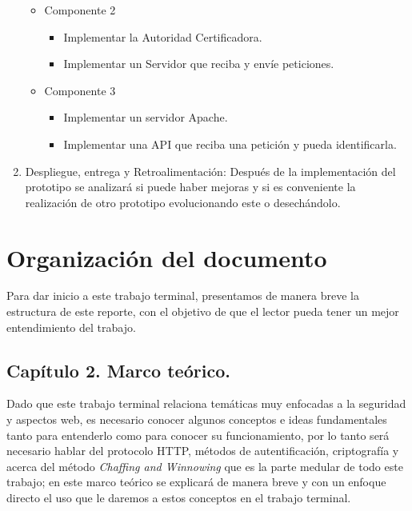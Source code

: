\documentclass[12pt, a4paper, titlepage]{report}
\begin{document}
\begin{enumerate}
\begin{itemize}
            	        \item Componente 2
            	            \begin{itemize}
            	                \item Implementar la Autoridad Certificadora.
            	                \item Implementar un Servidor que reciba y envíe peticiones.
            	            \end{itemize}
            	        \item Componente 3
            	            \begin{itemize}
            	                \item Implementar un servidor Apache.
            	                \item Implementar una API que reciba una petición y pueda identificarla.
            	            \end{itemize}
                    \end{itemize}
                \item Despliegue, entrega y Retroalimentaci\'on: Despu\'es de la implementación del prototipo se analizará si puede haber mejoras y si es conveniente la realización de otro prototipo evolucionando este o desechándolo.
                    
    		\end{enumerate}
    		
    		
    		
        
        \section{Organización del documento}
            Para dar inicio a este trabajo terminal, presentamos de manera breve la estructura de este reporte, con el objetivo de que el lector pueda tener un mejor entendimiento del trabajo.
             
            \subsection{Capítulo 2. Marco teórico.}
                Dado que este trabajo terminal relaciona temáticas muy enfocadas a la seguridad y aspectos web, es necesario conocer algunos conceptos e ideas fundamentales tanto para entenderlo como para conocer su funcionamiento, por lo tanto será necesario hablar del protocolo HTTP, métodos de autentificación, criptografía y acerca del método \textit{Chaffing and Winnowing} que es la parte medular de todo este trabajo; en este marco teórico se explicará de manera breve y con un enfoque directo el uso que le daremos a estos conceptos en el trabajo terminal.
             
\end{document}

